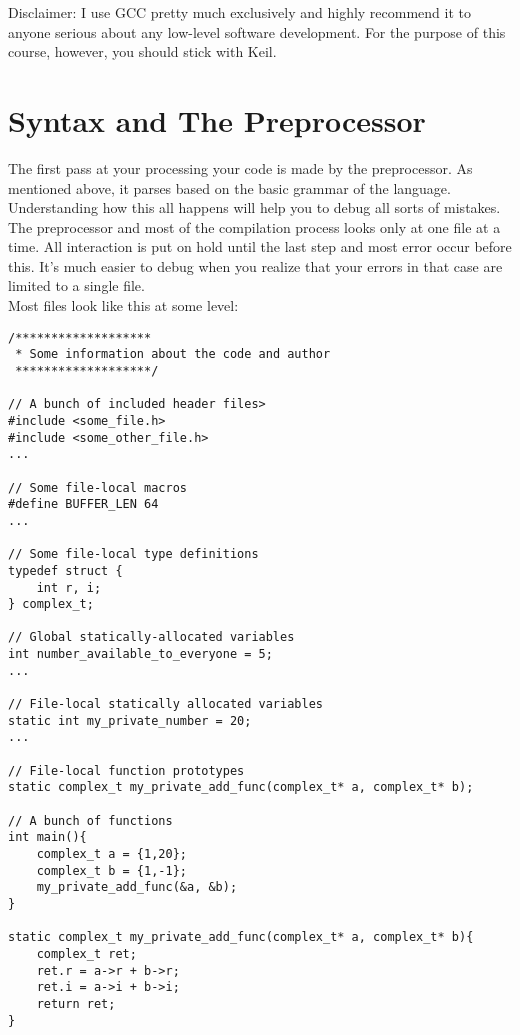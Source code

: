 \documentclass[10pt]{article}
\begin{document}
Disclaimer: I use GCC pretty much exclusively and highly recommend it to anyone serious about any low-level software development. For the purpose of this course, however, you should stick with Keil.

\section{Syntax and The Preprocessor}

The first pass at your processing your code is made by the preprocessor. As mentioned above, it parses based on the basic grammar of the language. Understanding how this all happens will help you to debug all sorts of mistakes. The preprocessor and most of the compilation process looks only at one file at a time. All interaction is put on hold until the last step and most error occur before this. It's much easier to debug when you realize that your errors in that case are limited to a single file. \\

Most files look like this at some level:
\begin{lstlisting}[label=lst-file-structure,caption=Common file structure]
/*******************
 * Some information about the code and author
 *******************/

// A bunch of included header files>
#include <some_file.h>
#include <some_other_file.h>
...

// Some file-local macros
#define BUFFER_LEN 64
...

// Some file-local type definitions
typedef struct {
	int r, i;
} complex_t;

// Global statically-allocated variables
int number_available_to_everyone = 5;
...

// File-local statically allocated variables
static int my_private_number = 20;
...

// File-local function prototypes
static complex_t my_private_add_func(complex_t* a, complex_t* b);

// A bunch of functions
int main(){
	complex_t a = {1,20};
	complex_t b = {1,-1};
	my_private_add_func(&a, &b);
}

static complex_t my_private_add_func(complex_t* a, complex_t* b){
	complex_t ret;
	ret.r = a->r + b->r;
	ret.i = a->i + b->i;
	return ret;
}
\end{lstlisting}
\end{document}

